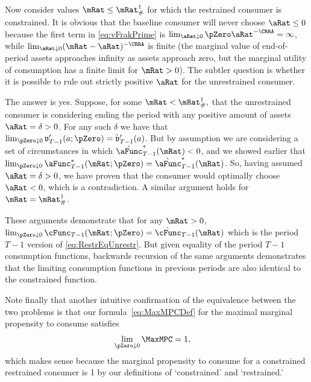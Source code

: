 \documentclass[\econtexRoot/BufferStockTeory.tex]{subfiles}
\begin{document}
Now consider values $\mRat\leq \mRat^{1}_{\#}$ for which the restrained consumer
is constrained.  It is obvious that the baseline consumer will never
choose $\aRat \leq 0$ because the first term in \eqref{eq:vFrakPrime} is $\lim_{\aRat \downarrow 0} \pZero  \aRat^{-\CRRA} =
\infty$, while $\lim_{\aRat \downarrow 0} (\mRat-\aRat)^{-\CRRA}$ is finite (the
marginal value of end-of-period assets approaches infinity as assets approach
zero, but the marginal utility of consumption has a finite limit for $\mRat>0$).
The subtler question is whether it is possible to rule out strictly positive
$\aRat$ for the unrestrained consumer.

The answer is yes.  Suppose, for some $\mRat < \mRat^{1}_{\#},$ that the
unrestrained consumer is considering ending the period with any
positive amount of assets $\aRat=\delta > 0$.  For any such $\delta$ we
have that $\lim_{\pZero  \downarrow 0} \mathfrak{v}_{T-1}^{\prime}(a;\pZero)=\grave{\mathfrak{v}}_{T-1}^{\prime}(a)$.
But by assumption we are considering a set of circumstances in which
$\grave{\aFunc}_{T-1}^{*}(\mRat) < 0$, and we showed earlier that
$\lim_{\pZero  \downarrow 0} \aFunc_{T-1}^{*}(\mRat;\pZero) = \grave{\aFunc}_{T-1}^{*}(\mRat)$.  So,
having assumed $\aRat = \delta > 0$, we have proven that the consumer
would optimally choose $\aRat < 0$, which is a contradiction.  A similar
argument holds for $\mRat = \mRat^{1}_{\#}$.

These arguments demonstrate that for any $\mRat>0$, $\lim_{\pZero
  \downarrow 0} \cFunc_{T-1}(\mRat;\pZero) =
\grave{\cFunc}_{T-1}(\mRat)$ which is the period $T-1$ version of
\eqref{eq:RestrEqUnrestr}.  But given equality of the period $T-1$
consumption functions, backwards recursion of the same arguments
demonstrates that the limiting consumption functions in previous
periods are also identical to the constrained function.

Note finally that another intuitive confirmation of the equivalence
between the two problems is that our formula~\eqref{eq:MaxMPCDef} for the maximal marginal
propensity to consume satisfies
\begin{eqnarray*}
  \lim_{\pZero \downarrow 0} \MaxMPC  & = 1,
\end{eqnarray*}
which makes sense because the marginal propensity to consume for a
constrained restrained consumer is 1 by our definitions of
`constrained' and `restrained.'

\onlyinsubfile{}
\end{document}
